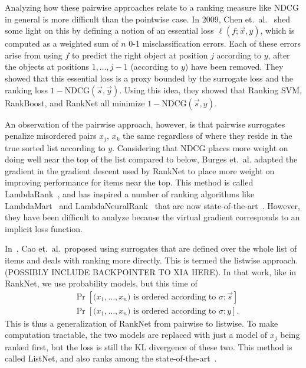 Analyzing how these pairwise approaches relate to a ranking measure like
NDCG in general is more difficult than the pointwise case.
In 2009, Chen et.\ al.~\cite{chen2009rankingmeasures} shed some light on this
by defining a notion of an essential loss $\ell(f; \vec{x}, y)$, which
is computed as a weighted sum of $n$ 0-1 misclassification errors.
Each of these errors arise from using $f$ to predict the right object at
position $j$ according to $y$,
after the objects at positions $1, \ldots, j-1$ (according to $y$) have been
removed. They showed that this essential loss is a proxy bounded by
the surrogate loss and the ranking loss $1 - \text{NDCG}(\vec{s}, \vec{y})$.
Using this idea, they showed that Ranking SVM, RankBoost, and RankNet all
minimize $1 - \text{NDCG}(\vec{s}, y)$.

An observation of the pairwise approach, however, is that pairwise surrogates
penalize misordered pairs $x_j$, $x_k$ the same regardless of where they
reside in the true sorted list according to $y$.
Considering that NDCG places more weight on doing well near the top of the list
compared to below, Burges et.\ al. adapted the gradient in the gradient descent
used by RankNet to place more weight on improving performance for items near
the top. This method is called LambdaRank~\cite{Burges2007lambdarank},
and has inspired a number of
ranking algorithms like LambdaMart~\cite{Burges2010ranknetlambdamart} and
LambdaNeuralRank~\cite{papini2012neuralrank}
that are now state-of-the-art~\cite{tax2015benchmark}. However, they
have been difficult to analyze because the virtual gradient corresponds to
an implicit loss function.

In~\cite{cao2007-pairwiselistwise}, Cao et.\ al.\ proposed using 
surrogates that are defined over the whole list of items and deals with ranking
more directly. This is termed the listwise approach. 
(POSSIBLY INCLUDE BACKPOINTER TO XIA HERE).
In that work, like in RankNet, we use probability models, but this time of
\begin{align*}
  &\Pr[\text{($x_1, \ldots, x_n$) is ordered according to $\sigma$} ; \vec{s}] \\
  &\Pr[\text{($x_1, \ldots, x_n$) is ordered according to $\sigma$} ; y].
\end{align*}
This is thus a generalization of RankNet from pairwise to listwise. To make
computation tractable, the two models are replaced with just a model of
$x_j$ being ranked first, but the loss is still the KL divergence of these two.
This method is called ListNet, and also ranks among the
state-of-the-art~\cite{tax2015benchmark}.

